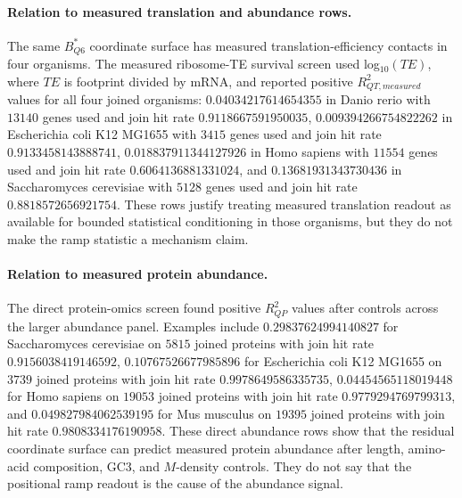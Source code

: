 \paragraph{Relation to measured translation and abundance rows.}
The same $B^{*}_{Q6}$ coordinate surface has measured translation-efficiency contacts in four organisms. The measured ribosome-TE survival screen used log$_{10}(TE)$, where $TE$ is footprint divided by mRNA, and reported positive $R^2_{QT,measured}$ values for all four joined organisms: $0.04034217614654355$ in Danio rerio with $13140$ genes used and join hit rate $0.9118667591950035$, $0.009394266754822262$ in Escherichia coli K12 MG1655 with $3415$ genes used and join hit rate $0.9133458143888741$, $0.018837911344127926$ in Homo sapiens with $11554$ genes used and join hit rate $0.6064136881331024$, and $0.13681931343730436$ in Saccharomyces cerevisiae with $5128$ genes used and join hit rate $0.8818572656921754$. These rows justify treating measured translation readout as available for bounded statistical conditioning in those organisms, but they do not make the ramp statistic a mechanism claim.

\paragraph{Relation to measured protein abundance.}
The direct protein-omics screen found positive $R^2_{QP}$ values after controls across the larger abundance panel. Examples include $0.29837624994140827$ for Saccharomyces cerevisiae on $5815$ joined proteins with join hit rate $0.9156038419146592$, $0.10767526677985896$ for Escherichia coli K12 MG1655 on $3739$ joined proteins with join hit rate $0.9978649586335735$, $0.04454565118019448$ for Homo sapiens on $19053$ joined proteins with join hit rate $0.9779294769799313$, and $0.049827984062539195$ for Mus musculus on $19395$ joined proteins with join hit rate $0.9808334176190958$. These direct abundance rows show that the residual coordinate surface can predict measured protein abundance after length, amino-acid composition, GC3, and $M$-density controls. They do not say that the positional ramp readout is the cause of the abundance signal.

